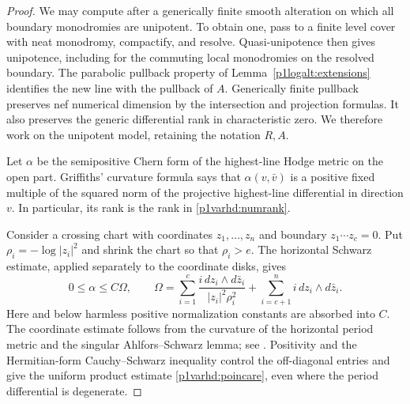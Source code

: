 \begin{proof}
We may compute after a generically finite smooth alteration on
which all boundary monodromies are unipotent.  To obtain one, pass
to a finite level cover with neat monodromy, compactify, and resolve.
Quasi-unipotence then gives unipotence, including for the commuting
local monodromies on the resolved boundary.  The parabolic pullback
property of Lemma~\ref{p1logalt:extensions} identifies the new line
with the pullback of $A$.
Generically finite pullback preserves nef numerical dimension by
the intersection and projection formulas.  It also preserves the
generic differential rank in characteristic zero.  We therefore
work on the unipotent model, retaining the notation $R,A$.

Let $\alpha$ be the semipositive Chern form of the highest-line
Hodge metric on the open part. Griffiths' curvature formula
\cite[Theorem~5.2, Formula~5.3, and Formula~6.18]{GriffithsPeriodsIII} says
that $\alpha(v,\bar v)$ is a positive fixed multiple of the squared
norm of the projective highest-line differential in direction $v$.
In particular, its rank is the rank in \eqref{p1varhd:numrank}.

Consider a crossing chart with coordinates $z_1,\ldots,z_n$ and
boundary $z_1\cdots z_c=0$.  Put
$\rho_i=-\log|z_i|^2$ and shrink the chart so that $\rho_i>e$.
The horizontal Schwarz estimate, applied separately to the
coordinate disks, gives
\begin{equation}\label{p1varhd:poincare}
 0\leq\alpha\leq C\Omega,
 \qquad
 \Omega=
 \sum_{i=1}^{c}\frac{i\,dz_i\wedge d\bar z_i}
                         {|z_i|^2\rho_i^2}
 +\sum_{i=c+1}^{n}i\,dz_i\wedge d\bar z_i.
\end{equation}
Here and below harmless positive normalization constants are
absorbed into $C$.  The coordinate estimate follows from the
curvature of the horizontal period metric and the singular
Ahlfors--Schwarz lemma; see \cite[\S 2.1, Proposition~2.4 and
Lemma~2.5]{BrunebarbeCadorel}.  Positivity and the Hermitian-form Cauchy--Schwarz
inequality control the off-diagonal entries and give the uniform
product estimate \eqref{p1varhd:poincare}, even where the period
differential is degenerate.


\end{proof}
